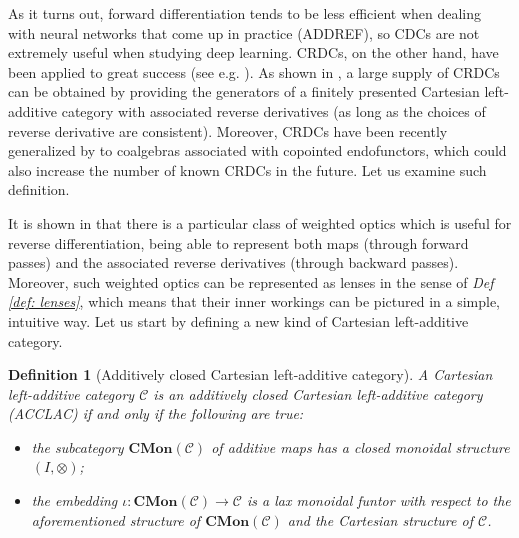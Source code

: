 \documentclass[12pt,a4paper,openright,twoside]{report}
\theoremstyle{plain}
\newtheorem{definition}[proposition]{Definition}
\theoremstyle{definition}
\begin{document}
As it turns out, forward differentiation tends to be less efficient when dealing with neural networks that come up in practice (ADDREF), so CDCs are not extremely useful when studying deep learning. CRDCs, on the other hand, have been applied to great success (see e.g. \cite{cruttwell2022categorical}). As shown in \cite{wilson2022categories}, a large supply of CRDCs can be obtained by providing the generators of a finitely presented Cartesian left-additive category with associated reverse derivatives (as long as the choices of reverse derivative are consistent).
Moreover, CRDCs have been recently generalized by \cite{gavranovic2024fundamental} to coalgebras associated with copointed endofunctors, which could also increase the number of known CRDCs in the future. Let us examine such definition.






























It is shown in \cite{gavranovic2024fundamental} that there is a particular class of weighted optics which is useful for reverse differentiation, being able to represent both maps (through forward passes) and the associated reverse derivatives (through backward passes). Moreover, such weighted optics can be represented as lenses in the sense of \textit{Def \ref{def: lenses}}, which means that their inner workings can be pictured in a simple, intuitive way.
Let us start by defining a new kind of Cartesian left-additive category.


\begin{definition}[Additively closed Cartesian left-additive category]
  A Cartesian left-additive category $\mathcal{C}$ is an additively closed Cartesian left-additive category (ACCLAC) if and only if the following are true:
  \begin{itemize}
    \item the subcategory $\mathbf{CMon}(\mathcal{C})$ of additive maps has a closed monoidal structure $(I, \otimes)$;
    \item the embedding $\iota: \mathbf{CMon}(\mathcal{C}) \to \mathcal{C}$ is a lax monoidal funtor with respect to the aforementioned structure of $\mathbf{CMon}(\mathcal{C})$ and the Cartesian structure of $\mathcal{C}$.
  \end{itemize}
\end{definition}
\end{document}
